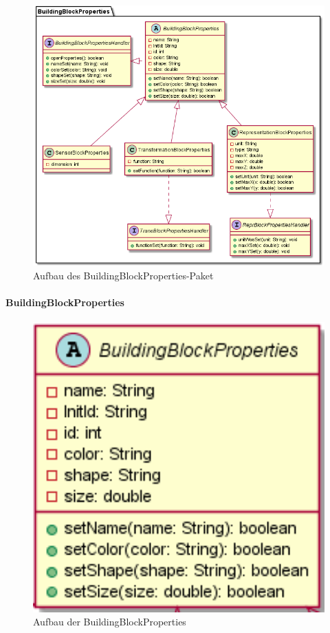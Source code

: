 \documentclass[parskip=full]{scrartcl}
\begin{document}
\begin{figure}[htbp]
	\begin{center}
		\includegraphics[width = 14cm]{Grafiken/View/BuildingBlockPropertiesNamespace.png}
		\caption{Aufbau des BuildingBlockProperties-Paket}
		\label{Entwurf_Grob}
	\end{center}
\end{figure}

\paragraph{BuildingBlockProperties}

\begin{figure}[htbp]
	\begin{center}
		\includegraphics[width = 14cm]{Grafiken/View/BuildingBlockProperties.png}
		\caption{Aufbau der BuildingBlockProperties}
		\label{Entwurf_Grob}
	\end{center}
\end{figure}
\end{document}
